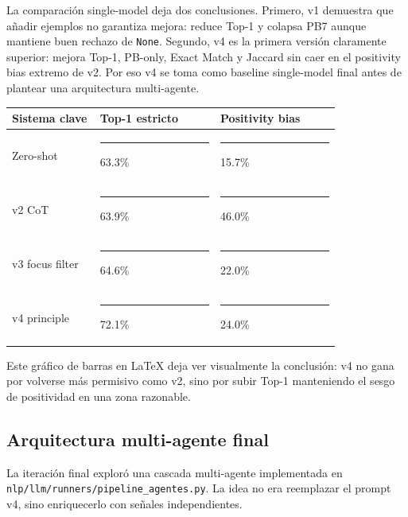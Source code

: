La comparación single-model deja dos conclusiones. Primero, v1 demuestra que añadir ejemplos no garantiza mejora: reduce Top-1 y colapsa PB7 aunque mantiene buen rechazo de \texttt{None}. Segundo, v4 es la primera versión claramente superior: mejora Top-1, PB-only, Exact Match y Jaccard sin caer en el positivity bias extremo de v2. Por eso v4 se toma como baseline single-model final antes de plantear una arquitectura multi-agente.

\begin{center}
\scriptsize
\setlength{\tabcolsep}{5pt}
\renewcommand{\arraystretch}{1.2}
\begin{tabular}{p{0.22\linewidth}p{0.30\linewidth}p{0.30\linewidth}}
\toprule
Sistema clave & Top-1 estricto & Positivity bias \\
\midrule
Zero-shot & \rule{3.08cm}{0.8ex} 63.3\% & \rule{0.85cm}{0.8ex} 15.7\% \\
v2 CoT & \rule{3.11cm}{0.8ex} 63.9\% & \rule{2.50cm}{0.8ex} 46.0\% \\
v3 focus filter & \rule{3.14cm}{0.8ex} 64.6\% & \rule{1.20cm}{0.8ex} 22.0\% \\
v4 principle & \rule{3.50cm}{0.8ex} 72.1\% & \rule{1.30cm}{0.8ex} 24.0\% \\
\bottomrule
\end{tabular}
\end{center}

Este gráfico de barras en LaTeX deja ver visualmente la conclusión: v4 no gana por volverse más permisivo como v2, sino por subir Top-1 manteniendo el sesgo de positividad en una zona razonable.

\subsection{Arquitectura multi-agente final}

La iteración final exploró una cascada multi-agente implementada en \texttt{nlp/llm/runners/pipeline\_agentes.py}. La idea no era reemplazar el prompt v4, sino enriquecerlo con señales independientes.



